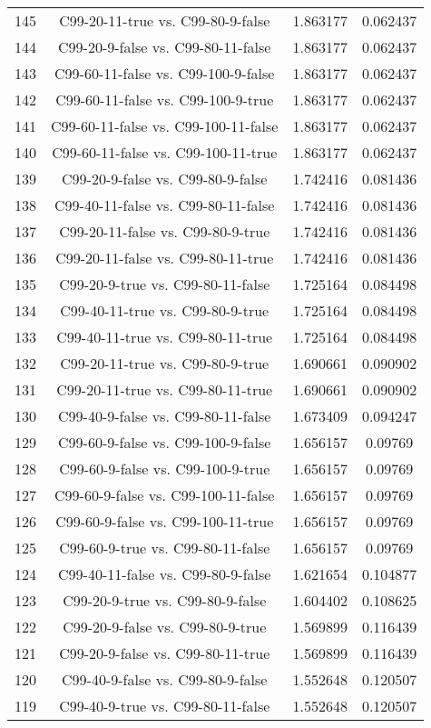 \documentclass[a4paper,10pt]{article}
\begin{document}
\begin{landscape}
\begin{table}[!htp]
\begin{tabular}{cccc}
145&C99-20-11-true vs. C99-80-9-false&1.863177&0.062437\\
144&C99-20-9-false vs. C99-80-11-false&1.863177&0.062437\\
143&C99-60-11-false vs. C99-100-9-false&1.863177&0.062437\\
142&C99-60-11-false vs. C99-100-9-true&1.863177&0.062437\\
141&C99-60-11-false vs. C99-100-11-false&1.863177&0.062437\\
140&C99-60-11-false vs. C99-100-11-true&1.863177&0.062437\\
139&C99-20-9-false vs. C99-80-9-false&1.742416&0.081436\\
138&C99-40-11-false vs. C99-80-11-false&1.742416&0.081436\\
137&C99-20-11-false vs. C99-80-9-true&1.742416&0.081436\\
136&C99-20-11-false vs. C99-80-11-true&1.742416&0.081436\\
135&C99-20-9-true vs. C99-80-11-false&1.725164&0.084498\\
134&C99-40-11-true vs. C99-80-9-true&1.725164&0.084498\\
133&C99-40-11-true vs. C99-80-11-true&1.725164&0.084498\\
132&C99-20-11-true vs. C99-80-9-true&1.690661&0.090902\\
131&C99-20-11-true vs. C99-80-11-true&1.690661&0.090902\\
130&C99-40-9-false vs. C99-80-11-false&1.673409&0.094247\\
129&C99-60-9-false vs. C99-100-9-false&1.656157&0.09769\\
128&C99-60-9-false vs. C99-100-9-true&1.656157&0.09769\\
127&C99-60-9-false vs. C99-100-11-false&1.656157&0.09769\\
126&C99-60-9-false vs. C99-100-11-true&1.656157&0.09769\\
125&C99-60-9-true vs. C99-80-11-false&1.656157&0.09769\\
124&C99-40-11-false vs. C99-80-9-false&1.621654&0.104877\\
123&C99-20-9-true vs. C99-80-9-false&1.604402&0.108625\\
122&C99-20-9-false vs. C99-80-9-true&1.569899&0.116439\\
121&C99-20-9-false vs. C99-80-11-true&1.569899&0.116439\\
120&C99-40-9-false vs. C99-80-9-false&1.552648&0.120507\\
119&C99-40-9-true vs. C99-80-11-false&1.552648&0.120507\\

\end{tabular}
\end{table}
\end{landscape}
\end{document}
